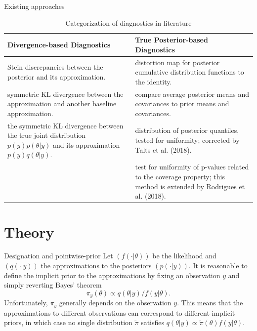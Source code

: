\documentclass{beamer}
\begin{document}
	\begin{frame}{Existing approaches}
		\begin{table}[bhtp]
			\centering
			\begin{tabular}{|p{0.45\textwidth}|p{}|}
				\hline
				\textbf{Divergence-based Diagnostics} & \textbf{True Posterior-based Diagnostics} \\
				\hline
				Stein discrepancies between the posterior and its approximation. & distortion map for posterior cumulative distribution functions to the identity. \\
				symmetric KL divergence between the approximation and another baseline approximation. & compare average posterior means and covariances to prior means and covariances. \\
				the symmetric KL divergence between the true joint distribution \( p(y)p(\theta|y) \) and its approximation \( p(y)q(\theta|y) \). & distribution of posterior quantiles, tested for uniformity; corrected by Talts et al. (2018). \\
				& test for uniformity of p-values related to the coverage property; this method is extended by Rodrigues et al. (2018). \\
				\hline
			\end{tabular}
			\caption{Categorization of diagnostics in literature}
		\end{table}
	\end{frame}
	
	
	\section{Theory}
	\begin{frame}{Designation and pointwise-prior}
		Let \( (f(\cdot|\theta)) \) be the likelihood and \( (q(\cdot|y)) \) the approximations to the posteriors \( (p(\cdot|y)) \). It is reasonable to define the implicit prior to the approximations by fixing an observation \( y \) and simply reverting Bayes' theorem
		\[ \pi_y(\theta) \propto q(\theta|y)/f(y|\theta). \]
		Unfortunately, \( \pi_y \) generally depends on the observation \( y \). This means that the approximations to different observations can correspond to different implicit priors, in which case no single distribution \( \tilde{\pi} \) satisfies \( q(\theta|y) \propto \tilde{\pi}(\theta)f(y|\theta) \).
	\end{frame}
	
\end{document}
